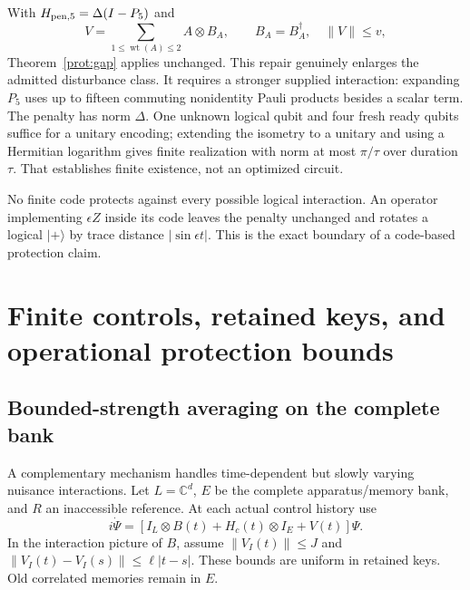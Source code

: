 \documentclass[11pt,oneside,openany]{book}
\theoremstyle{definition}
\theoremstyle{remark}\newtheorem{remark}[theorem]{Remark}
\begin{document}
With $H_{{\rm pen},5}=\Delta(I-P_5)$ and
\[
 V=\sum_{1\le\operatorname{wt}(A)\le2}A\otimes B_A,
 \qquad B_A=B_A^\dagger,\quad\|V\|\le v,
\]
Theorem~\ref{prot:gap} applies unchanged. This repair genuinely enlarges the admitted disturbance class. It requires a stronger supplied interaction: expanding $P_5$ uses up to fifteen commuting nonidentity Pauli products besides a scalar term. The penalty has norm $\Delta$. One unknown logical qubit and four fresh ready qubits suffice for a unitary encoding; extending the isometry to a unitary and using a Hermitian logarithm gives finite realization with norm at most $\pi/\tau$ over duration $\tau$. That establishes finite existence, not an optimized circuit.

No finite code protects against every possible logical interaction. An operator implementing $\epsilon Z$ inside its code leaves the penalty unchanged and rotates a logical $|+\rangle$ by trace distance $|\sin\epsilon t|$. This is the exact boundary of a code-based protection claim.

\chapter[Controls, keys, and operational protection]{Finite controls, retained keys, and operational protection bounds}
\label{prot:integrationchapter}

\section{Bounded-strength averaging on the complete bank}

A complementary mechanism handles time-dependent but slowly varying nuisance interactions. Let $L=\mathbb C^d$, $E$ be the complete apparatus/memory bank, and $R$ an inaccessible reference. At each actual control history use
\begin{equation}
 i\dot\Psi=[I_L\otimes B(t)+H_c(t)\otimes I_E+V(t)]\Psi.
 \label{prot:controlsource}
\end{equation}
In the interaction picture of $B$, assume $\|V_I(t)\|\le J$ and
$\|V_I(t)-V_I(s)\|\le\ell|t-s|$. These bounds are uniform in retained keys. Old correlated memories remain in $E$.
\end{document}
